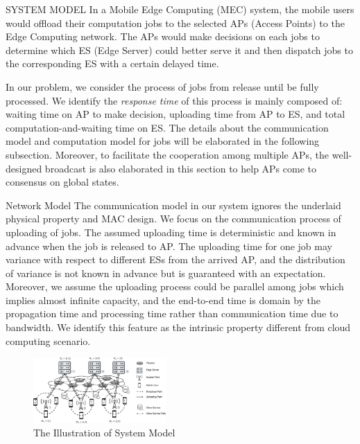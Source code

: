 \documentclass[10pt, conference, letterpaper]{IEEEtran}
\begin{document}
    \begin{section}{SYSTEM MODEL}
        In a Mobile Edge Computing (MEC) system, the mobile users would offload their computation jobs to the selected APs (Access Points) to the Edge Computing network. The APs would make decisions on each jobs to determine which ES (Edge Server) could better serve it and then dispatch jobs to the corresponding ES with a certain delayed time.
            
        In our problem, we consider the process of jobs from release until be fully processed. We identify the \emph{response time} of this process is mainly composed of: waiting time on AP to make decision, uploading time from AP to ES, and total computation-and-waiting time on ES.
        The details about the communication model and computation model for jobs will be elaborated in the following subsection. Moreover, to facilitate the cooperation among multiple APs, the well-designed broadcast is also elaborated in this section to help APs come to consensus on global states.

        \begin{subsection}{Network Model}
            The communication model in our system ignores the underlaid physical property and MAC design. We focus on the communication process of uploading of jobs.
            The assumed uploading time is deterministic and known in advance when the job is released to AP. The uploading time for one job may variance with respect to different ESs from the arrived AP, and the distribution of variance is not known in advance but is guaranteed with an expectation.
            Moreover, we assume the uploading process could be parallel among jobs which implies almost infinite capacity, and the end-to-end time is domain by the propagation time and processing time rather than communication time due to bandwidth. We identify this feature as the intrinsic property different from cloud computing scenario.
            \begin{figure}[h]
                \centering
                \includegraphics[width=0.45\textwidth, trim={0.5cm 0.5cm 0.5cm 0.5cm}, clip]{system-model.pdf}
                \caption{The Illustration of System Model}
                \label{fig:system}
            \end{figure}
                

\end{subsection}
\end{section}
\end{document}
